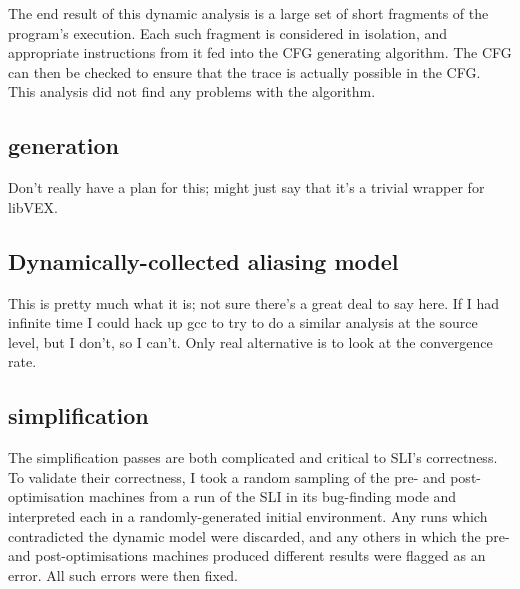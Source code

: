 The end result of this dynamic analysis is a large set of short fragments of the program's execution.
Each such fragment is considered in isolation, and appropriate instructions from it fed into the CFG generating algorithm.
The CFG can then be checked to ensure that the trace is actually possible in the CFG.
This analysis did not find any problems with the algorithm.

\subsection{\StateMachine generation}

Don't really have a plan for this; might just say that it's a trivial wrapper for libVEX.

\subsection{Dynamically-collected aliasing model}

This is pretty much what it is; not sure there's a great deal to say here.
If I had infinite time I could hack up gcc to try to do a similar analysis at the source level, but I don't, so I can't.
Only real alternative is to look at the convergence rate.

\subsection{\StateMachine simplification}

The \StateMachine simplification passes are both complicated and critical to SLI's correctness.
To validate their correctness, I took a random sampling of the pre- and post-optimisation machines from a run of the SLI in its bug-finding mode and interpreted each in a randomly-generated initial environment.
Any runs which contradicted the dynamic model were discarded, and any others in which the pre- and post-optimisations machines produced different results were flagged as an error.
All such errors were then fixed.


